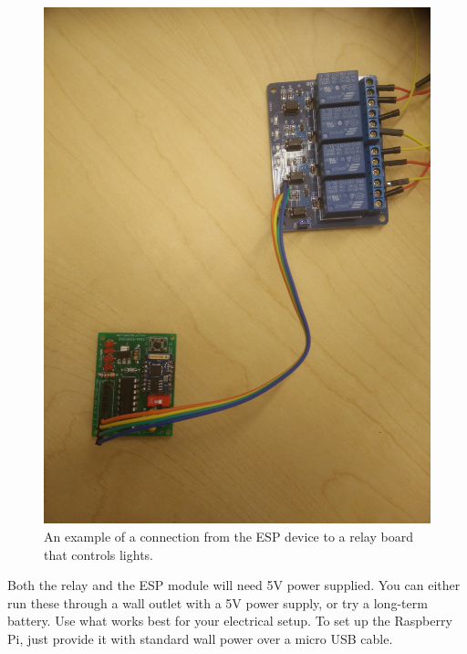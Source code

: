 \begin{figure}[h!]
   \includegraphics[scale=0.05]{connection}
   \caption{An example of a connection from the ESP device to a relay board that controls lights.}
\end{figure}
Both the relay and the ESP module will need 5V power supplied. You can either run these through a wall outlet with a 5V power supply, or try a long-term battery. Use what works best for your electrical setup. To set up the Raspberry Pi, just provide it with standard wall power over a micro USB cable.

